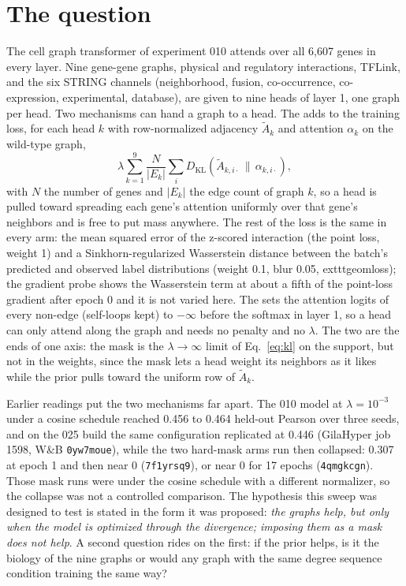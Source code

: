 
\section{The question}
\label{sec:question}

The cell graph transformer of experiment 010 attends over all 6{,}607 genes in every
layer. Nine gene-gene graphs, physical and regulatory interactions, TFLink, and the six
STRING channels (neighborhood, fusion, co-occurrence, co-expression, experimental,
database), are given to nine heads of layer 1, one graph per head. Two mechanisms can
hand a graph to a head. The  adds to the training loss, for each head
$k$ with row-normalized adjacency $\tilde{A}_k$ and attention $\alpha_k$ on the
wild-type graph,
\begin{equation}
  \lambda \sum_{k=1}^{9} \frac{N}{|E_k|}
  \sum_{i} D_{\mathrm{KL}}\!\left(\tilde{A}_{k,i\cdot} \,\|\, \alpha_{k,i\cdot}\right),
  \label{eq:kl}
\end{equation}
with $N$ the number of genes and $|E_k|$ the edge count of graph $k$, so a head is pulled
toward spreading each gene's attention uniformly over that gene's neighbors and is free
to put mass anywhere. The rest of the loss is the same in every arm: the mean squared
error of the z-scored interaction (the point loss, weight 1) and a Sinkhorn-regularized
Wasserstein distance between the batch's predicted and observed label distributions
(weight 0.1, blur 0.05, 	exttt{geomloss}); the gradient probe shows the Wasserstein
term at about a fifth of the point-loss gradient after epoch 0 and it is not varied
here. The  sets the attention logits of every
non-edge (self-loops kept) to $-\infty$ before the softmax in layer 1, so a head can only
attend along the graph and needs no penalty and no $\lambda$. The two are the ends of one
axis: the mask is the $\lambda \to \infty$ limit of Eq.~\ref{eq:kl} on the support, but
not in the weights, since the mask lets a head weight its neighbors as it likes while the
prior pulls toward the uniform row of $\tilde{A}_k$.

Earlier readings put the two mechanisms far apart. The 010 model at $\lambda = 10^{-3}$
under a cosine schedule reached 0.456 to 0.464 held-out Pearson over three seeds, and on
the 025 build the same configuration replicated at 0.446 (GilaHyper job 1598, W\&B
\texttt{0yw7moue}), while the two hard-mask arms run then collapsed: 0.307 at epoch 1
and then near 0 (\texttt{7f1yrsq9}), or near 0 for 17 epochs (\texttt{4qmgkcgn}). Those
mask runs were under the cosine schedule with a different normalizer, so the collapse was
not a controlled comparison. The hypothesis this sweep was designed to test is stated in
the form it was proposed: \emph{the graphs help, but only when the model is optimized
through the divergence; imposing them as a mask does not help}. A second question rides
on the first: if the prior helps, is it the biology of the nine graphs or would any graph
with the same degree sequence condition training the same way?

